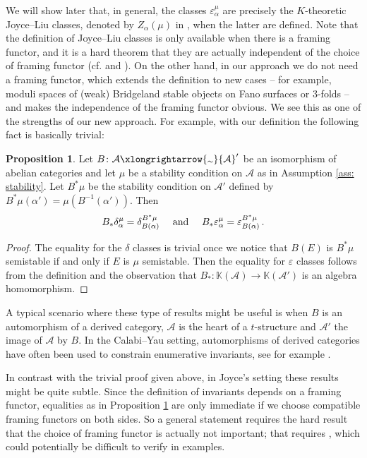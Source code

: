 \documentclass[12pt]{amsart}
\theoremstyle{definition}
\newtheorem{proposition}[definition]{Proposition}
\newcommand{\BK}{{\mathbb{K}}}
\newcommand{\CA}{{\mathcal A}}
\newcommand{\1}{\mathbf 1}
\newcommand{\isoto}{\xlongrightarrow{\raisebox{-0.3ex}[0pt][0pt]{\(\scriptstyle\sim\)}}}
\begin{document}
We will show later that, in general, the classes $\varepsilon_\alpha^\mu$ are precisely the $K$-theoretic Joyce--Liu classes, denoted by $Z_\alpha(\mu)$ in \cite{Liu}, when the latter are defined. Note that the definition of Joyce--Liu classes is only available when there is a framing functor, and it is a hard theorem that they are actually independent of the choice of framing functor (cf. \cite[Proposition 9.12]{joyce} and \cite[Theorem 4.2.5]{Liu}). On the other hand, in our approach we do not need a framing functor, which extends the definition to new cases -- for example, moduli spaces of (weak) Bridgeland stable objects on Fano surfaces or 3-folds -- and makes the independence of the framing functor obvious. We see this as one of the strengths of our new approach. For example, with our definition the following fact is basically trivial:

\begin{proposition}\label{prop: autoequivalence}
    Let $B\colon \CA\isoto\CA'$ be an isomorphism of abelian categories and let $\mu$ be a stability condition on $\CA$ as in Assumption \ref{ass: stability}. Let $B^\ast\mu$ be the stability condition on $\CA'$ defined by $B^\ast\mu(\alpha')=\mu(B^{-1}(\alpha'))$. Then
    \[B_\ast \delta_\alpha^\mu=\delta_{B(\alpha)}^{B^\ast\mu}\quad\textup{ and }\quad B_\ast \varepsilon_\alpha^\mu=\varepsilon_{B(\alpha)}^{B^\ast\mu}\,.\]
\end{proposition}
\begin{proof}
    The equality for the $\delta$ classes is trivial once we notice that $B(E)$ is $B^\ast\mu$ semistable if and only if $E$ is $\mu$ semistable. Then the equality for $\varepsilon$ classes follows from the definition and the observation that $B_\ast\colon \BK(\CA)\to \BK(\CA')$ is an algebra homomorphism.
\end{proof}

A typical scenario where these type of results might be useful is when $B$ is an automorphism of a derived category, $\CA$ is the heart of a $t$-structure and $\CA'$ the image of $\CA$ by $B$. In the Calabi--Yau setting, automorphisms of derived categories have often been used to constrain enumerative invariants, see for example \cite{todaPTrationality, OS, BM, thomasrefinedK3}.

In contrast with the trivial proof given above, in Joyce's setting these results might be quite subtle. Since the definition of invariants depends on a framing functor, equalities as in Proposition \ref{prop: autoequivalence} are only immediate if we choose compatible framing functors on both sides. So a general statement requires the hard result that the choice of framing functor is actually not important; that requires \cite[Assumptions 5.1(g), 5.2(h)]{joyce}, which could potentially be difficult to verify in examples. 
\end{document}

